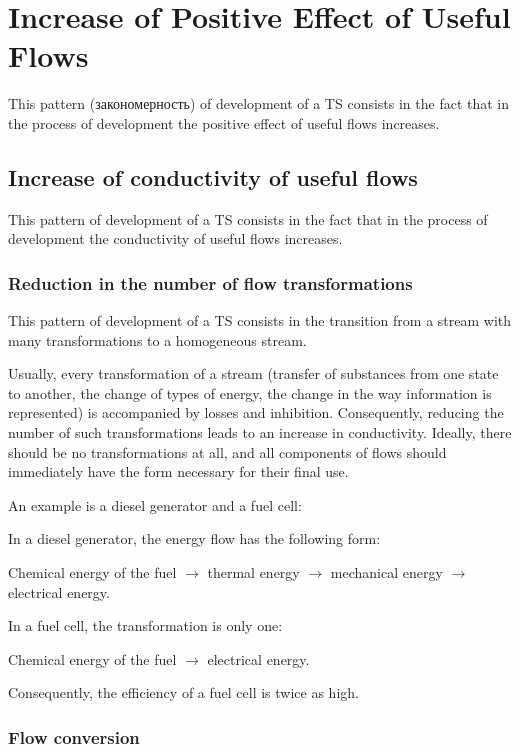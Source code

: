 \documentclass[a4paper,11pt]{article}
\begin{document}
\section{Increase of Positive Effect of Useful Flows}

This pattern (\foreignlanguage{russian}{закономерность}) of development of a
TS consists in the fact that in the process of development the positive effect
of useful flows increases.

\subsection{Increase of conductivity of useful flows}

This pattern of development of a TS consists in the fact that in the process
of development the conductivity of useful flows increases.

\subsubsection{Reduction in the number of flow transformations}

This pattern of development of a TS consists in the transition from a stream
with many transformations to a homogeneous stream.

Usually, every transformation of a stream (transfer of substances from one
state to another, the change of types of energy, the change in the way
information is represented) is accompanied by losses and inhibition.
Consequently, reducing the number of such transformations leads to an increase
in conductivity. Ideally, there should be no transformations at all, and all
components of flows should immediately have the form necessary for their final
use.

An example is a diesel generator and a fuel cell:

In a diesel generator, the energy flow has the following form:

Chemical energy of the fuel $\to$ thermal energy $\to$ mechanical energy $\to$
electrical energy.

In a fuel cell, the transformation is only one:

Chemical energy of the fuel $\to$ electrical energy.

Consequently, the efficiency of a fuel cell is twice as high.

\subsubsection{Flow conversion}
\end{document}
